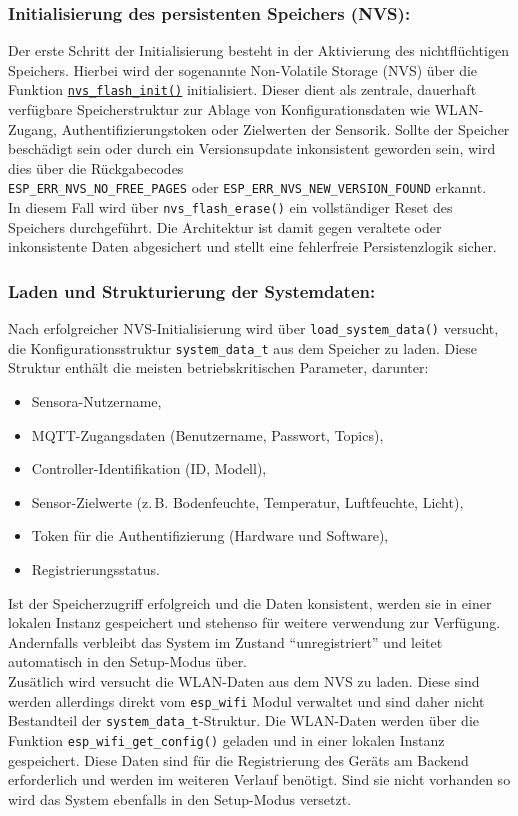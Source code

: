 \subsubsection{Initialisierung des persistenten Speichers (NVS):}  
Der erste Schritt der Initialisierung besteht in der Aktivierung des nichtflüchtigen Speichers. Hierbei wird der sogenannte Non-Volatile Storage (NVS) über die Funktion \texttt{\url{nvs\_flash\_init()}} initialisiert. Dieser dient als zentrale, dauerhaft verfügbare Speicherstruktur zur Ablage von Konfigurationsdaten wie WLAN-Zugang, Authentifizierungstoken oder Zielwerten der Sensorik. Sollte der Speicher beschädigt sein oder durch ein Versionsupdate inkonsistent geworden sein, wird dies über die Rückgabecodes
\\
\texttt{ESP\_ERR\_NVS\_NO\_FREE\_PAGES} oder \texttt{ESP\_ERR\_NVS\_NEW\_VERSION\_FOUND} erkannt. 
\\
In diesem Fall wird über \texttt{nvs\_flash\_erase()} ein vollständiger Reset des Speichers durchgeführt. Die Architektur ist damit gegen veraltete oder inkonsistente Daten abgesichert und stellt eine fehlerfreie Persistenzlogik sicher.

\subsubsection{Laden und Strukturierung der Systemdaten:}  
Nach erfolgreicher NVS-Initialisierung wird über \texttt{load\_system\_data()} versucht, die Konfigurationsstruktur \texttt{system\_data\_t} aus dem Speicher zu laden. Diese Struktur enthält die meisten betriebskritischen Parameter, darunter:
\begin{itemize}
	\item Sensora-Nutzername,
	\item MQTT-Zugangsdaten (Benutzername, Passwort, Topics),
	\item Controller-Identifikation (ID, Modell),
	\item Sensor-Zielwerte (z.\,B. Bodenfeuchte, Temperatur, Luftfeuchte, Licht),
	\item Token für die Authentifizierung (Hardware und Software),
	\item Registrierungsstatus.
\end{itemize}
Ist der Speicherzugriff erfolgreich und die Daten konsistent, werden sie in einer lokalen Instanz gespeichert und stehenso für weitere verwendung zur Verfügung. Andernfalls verbleibt das System im Zustand \enquote{unregistriert} und leitet automatisch in den Setup-Modus über. 
\\
Zusätlich wird versucht die WLAN-Daten aus dem NVS zu laden. Diese sind werden allerdings direkt vom \texttt{esp\_wifi} Modul verwaltet und sind daher nicht Bestandteil der \texttt{system\_data\_t}-Struktur. Die WLAN-Daten werden über die Funktion \texttt{esp\_wifi\_get\_config()} geladen und in einer lokalen Instanz gespeichert. Diese Daten sind für die Registrierung des Geräts am Backend erforderlich und werden im weiteren Verlauf benötigt. Sind sie nicht vorhanden so wird das System ebenfalls in den Setup-Modus versetzt.

